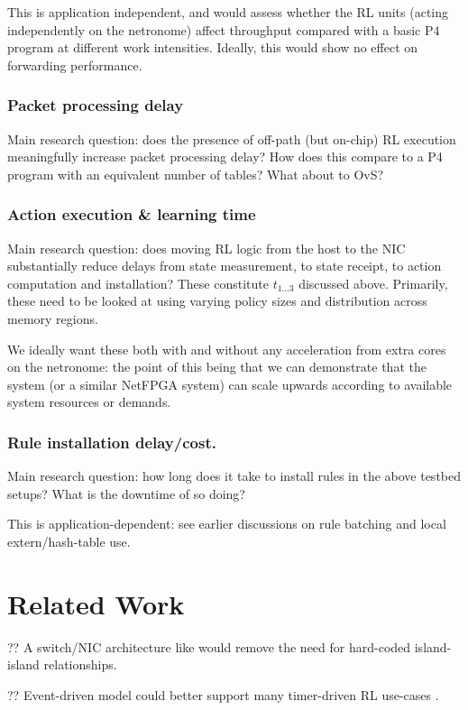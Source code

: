 \documentclass[sigconf,natbib=false]{acmart}
\begin{document}
This is application independent, and would assess whether the RL units (acting independently on the netronome) affect throughput compared with a basic P4 program at different work intensities.
Ideally, this would show no effect on forwarding performance.

\subsubsection{Packet processing delay}
Main research question: does the presence of off-path (but on-chip) RL execution meaningfully increase packet processing delay? How does this compare to a P4 program with an equivalent number of tables? What about to OvS?

\subsubsection{Action execution \& learning time}
Main research question: does moving RL logic from the host to the NIC substantially reduce delays from state measurement, to state receipt, to action computation and installation?
These constitute $t_{1...3}$ discussed above.
Primarily, these need to be looked at using varying policy sizes and distribution across memory regions.

We ideally want these both with and without any acceleration from extra cores on the netronome: the point of this being that we can demonstrate that the system (or a similar NetFPGA system) can scale upwards according to available system resources or demands.

\subsubsection{Rule installation delay/cost.}
Main research question: how long does it take to install rules in the above testbed setups? What is the downtime of so doing?

This is application-dependent: see earlier discussions on rule batching and local extern/hash-table use.

\section{Related Work}

?? A switch/NIC architecture like \textcite{DBLP:conf/hotnets/StephensAS18} would remove the need for hard-coded island-island relationships.

?? Event-driven model could better support many timer-driven RL use-cases \textcite{DBLP:conf/hotnets/IbanezABM19}.
\end{document}
